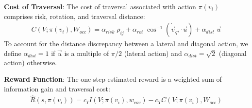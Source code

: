 \documentclass[letterpaper]{article} %
\newcommand{\ph}[1]{{\textbf{#1}:}} %
\begin{document}
\ph{Cost of Traversal} The cost of traversal associated with action $\pi(v_i)$ comprises risk, rotation, and traversal distance:
\begin{align}
    C(V; \pi(v_i), W_{occ}) = \alpha_{risk} \; \rho_{ij} + \alpha_{rot} \;  \cos^{-1}(\dot{\vec{v}}_q, \cdot \vec{u}) + \alpha_{dist} \; \vec{u}
    \label{eq:traversal_cost}
\end{align}
To account for the distance discrepancy between a lateral and diagonal action, we define $\alpha_{dist}=1$ if $\vec{u}$ is a multiple of $\pi/2$ (lateral action) and $\alpha_{dist}=\sqrt{2}$ (diagonal action) otherwise.






\ph{Reward Function} The one-step estimated reward is a weighted sum of information gain and traversal cost:
\begin{align}
    \hat{R}(s, \pi(v_i)) = c_{I} I(V; \pi(v_i), w_{cov}) - c_{T}  C(V; \pi(v_i), W_{occ})
    \label{eq:lattice_reward}
\end{align}








\end{document}
